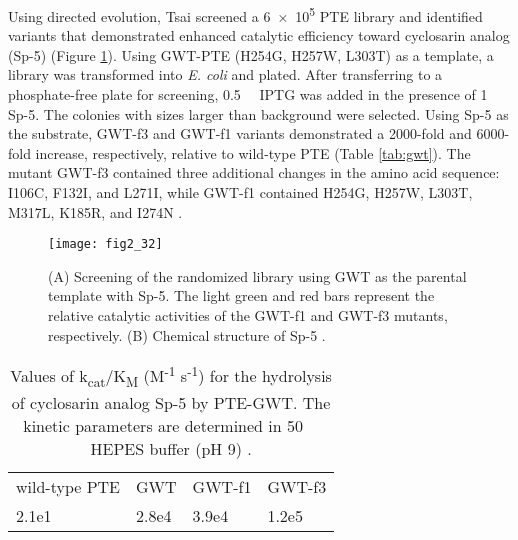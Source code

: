 \begin{refsection}
Using directed evolution, Tsai  screened a \num{6e5} PTE library
and identified variants that demonstrated enhanced catalytic efficiency toward
cyclosarin analog (Sp-5) \cite{Tsai2012b} (Figure \ref{fig:gwt}). Using
GWT-PTE (H254G, H257W, L303T) as a template, a library was transformed into
\emph{E. coli} and plated. After transferring to a phosphate-free plate for
screening, \SI{0.5}{\milli\Molar} IPTG was added in the presence of
\SI{1}{\milli\Molar} Sp-5. The colonies with sizes larger than background were
selected. Using Sp-5 as the substrate, GWT-f3 and GWT-f1 variants demonstrated a
2000-fold and 6000-fold increase, respectively, relative to wild-type PTE
\cite{Tsai2012b} (Table \ref{tab:gwt}).  The mutant GWT-f3 contained three
additional changes in the amino acid sequence: I106C, F132I, and L271I, while
GWT-f1 contained H254G, H257W, L303T, M317L, K185R, and I274N \cite{Tsai2012b}. 
\begin{figure}[htbp] \centering \texttt{[image: fig2\_32]}
    \caption[(A) Screening of the randomized library using GWT as the parental
        template with Sp-5. The light green and red bars represent the relative
        catalytic activities of the GWT-f1 and GWT-f3 mutants, respectively.
        (B) Chemical structure of Sp-5.]{(A) Screening of the randomized library
            using GWT as the parental template with Sp-5. The light green and
            red bars represent the relative catalytic activities of the GWT-f1
            and GWT-f3 mutants, respectively.  (B) Chemical structure of Sp-5
            \cite{Tsai2012b}.}
    \label{fig:gwt}
\end{figure}
\begin{table}[htbp]
    \centering
    \caption[Values of k\textsubscript{cat}/K\textsubscript{M}
        (M\textsuperscript{-1} s\textsuperscript{-1}) for the hydrolysis of
    cyclosarin analog Sp-5 by PTE-GWT. The kinetic parameters are determined in \SI{50}{\milli\Molar} HEPES buffer (pH 9).] {Values of k\textsubscript{cat}/K\textsubscript{M}
        (M\textsuperscript{-1} s\textsuperscript{-1}) for the hydrolysis of
    cyclosarin analog Sp-5 by PTE-GWT. The kinetic parameters are determined in \SI{50}{\milli\Molar} HEPES buffer (pH 9) \cite{Tsai2012b}.}
    \begin{tabular}{llll}
    \hline

    wild-type PTE & GWT & GWT-f1 & GWT-f3 \\ 
    2.1e1 & 2.8e4 & 3.9e4 & 1.2e5 \\


\end{tabular}
\end{table}
\end{refsection}
